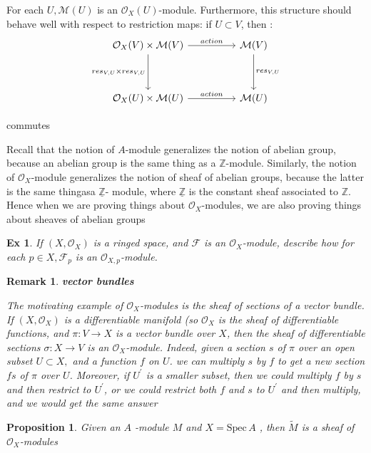 \documentclass{article}
\newtheorem{proposition}[theorem]{Proposition}
\newtheorem{remark}[theorem]{Remark}
\newtheorem{exercise}[theorem]{Ex}
\begin{document}
For each $U,\mathcal{M}(U)$ is an ${\mathcal{O}}_{X}(U)$-module. Furthermore, this structure should behave well with respect to restriction maps: if $U\subset V$, then :
\[\begin{tikzcd}
	{\mathcal O_X(V)\times\mathcal M(V)} && {\mathcal M(V)} \\
	\\
	{\mathcal O_X(U)\times\mathcal M(U)} && {\mathcal M(U)}
	\arrow["{res_{V,U}\times res_{V,U}}"', from=1-1, to=3-1]
	\arrow["action", from=1-1, to=1-3]
	\arrow["{res_{V,U}}", from=1-3, to=3-3]
	\arrow["action", from=3-1, to=3-3]
\end{tikzcd}\]

commutes

Recall that the notion of $A$-module generalizes the notion of abelian group,
because an abelian group is the same thing as a $\mathbb Z$-module. Similarly, the notion of ${\mathcal{O}}_{X}$-module generalizes the notion of sheaf of abelian groups, because the latter is the same thingasa $\underline{\mathbb{Z}}$- module, where $\underline{\mathbb{Z}}$ is the constant sheaf associated to $\mathbb{Z}$. Hence when we are proving things about $\mathcal{O}_{X}$-modules, we are also proving things about sheaves of abelian groups
\begin{exercise}
    If $(X,{\mathcal{O}}_{X})$ is a ringed space, and $\mathcal{F}$ is an ${\mathcal{O}}_{X}$-module, describe how for each $p\in X,{\mathcal{F}}_{p}$ is an ${\mathcal{O}}_{X,p}$-module.
\end{exercise}
\begin{remark}
    \textbf{vector bundles}
    
    The motivating example of ${\mathcal{O}}_{X}$-modules is the sheaf of sections of a vector bundle. If $(X,{\mathcal{O}}_{X})$ is a differentiable manifold (so ${\mathcal{O}}_{X}$ is the sheaf of differentiable functions, and $\pi : V \to X$ is a vector bundle over $X$, then the sheaf of differentiable sections $\sigma\colon X\to V$ is an ${\mathcal{O}}_{X}$-module. Indeed, given a section $s$ of $\pi$ over an open subset $U\subset X,$ and a function $f$ on $U$. we can multiply $s$ by $f$ to get a new section $fs$ of $\pi$ over $U$. Moreover, if $U^\prime$ is a smaller subset, then we could multiply $f$ by $s$ and then restrict to $U^\prime$, or we could restrict both $f$ and $s$ to $U^\prime$ and then multiply, and we would get the same answer
\end{remark}

\begin{proposition}
    Given an $A$ -module $M$ and $X={\mathrm{Spec}}\,A$ , then $\widetilde{{M}}$ is a sheaf of ${\mathcal{O}}_{X}$-modules
\end{proposition}
\end{document}
